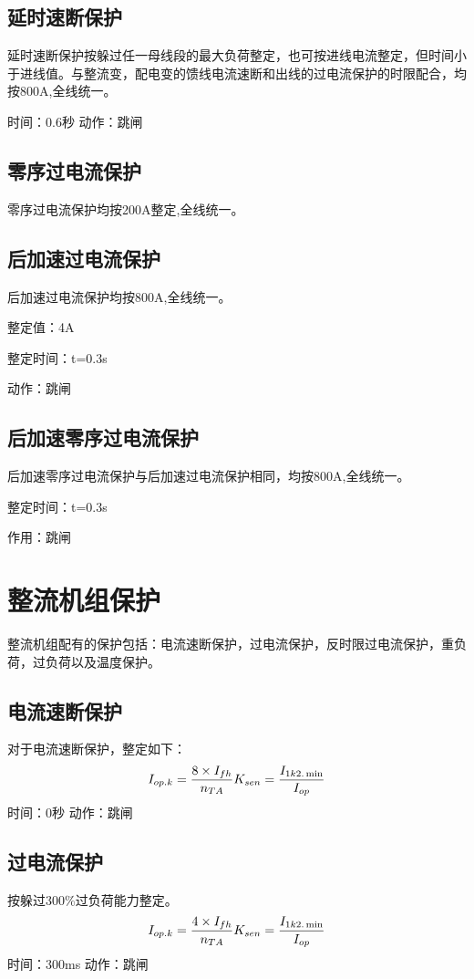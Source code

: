 \subsection{延时速断保护}
延时速断保护按躲过任一母线段的最大负荷整定，也可按进线电流整定，但时间小于进线值。与整流变，配电变的馈线电流速断和出线的过电流保护的时限配合，均按800A,全线统一。\par 
时间：0.6秒\newline
动作：跳闸
\subsection{零序过电流保护}
零序过电流保护均按200A整定,全线统一。
\subsection{后加速过电流保护}
后加速过电流保护均按800A,全线统一。\par 
整定值：4A\par
整定时间：t=0.3s\par 
动作：跳闸
\subsection{后加速零序过电流保护}
后加速零序过电流保护与后加速过电流保护相同，均按800A,全线统一。\par 
整定时间：t=0.3s\par
作用：跳闸

\section{整流机组保护}
整流机组配有的保护包括：电流速断保护，过电流保护，反时限过电流保护，重负荷，过负荷以及温度保护。
\subsection{电流速断保护}
对于电流速断保护，整定如下：
$$
I_{op.k}=\frac{8\times I_{fh}}{n_{TA}}
\\
K_{sen}=\frac{I_{1k2.\min}}{I_{op}}
$$
时间：0秒\newline 
动作：跳闸
\subsection{过电流保护}
按躲过300\%过负荷能力整定。
$$
I_{op.k}=\frac{4\times I_{fh}}{n_{TA}}
\\
K_{sen}=\frac{I_{1k2.\min}}{I_{op}}
$$
时间：300ms\newline
动作：跳闸
